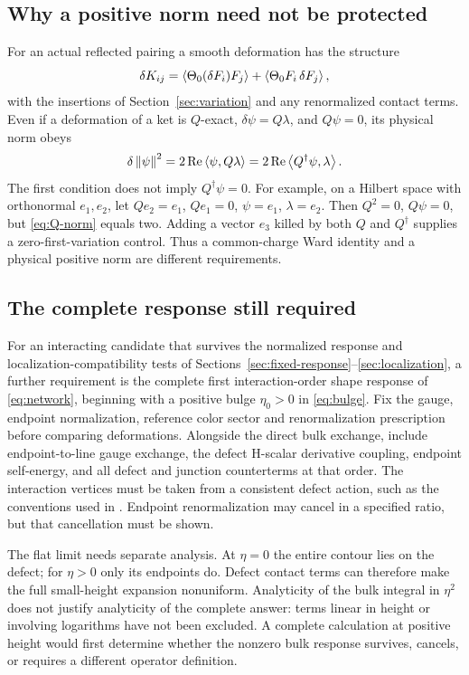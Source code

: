 \subsection{Why a positive norm need not be protected}

For an actual reflected pairing a smooth deformation has the structure
\begin{equation}
 \delta K_{ij}=\left\langle\Theta_0(\delta F_i)F_j\right\rangle
                 +\left\langle\Theta_0F_i\,\delta F_j\right\rangle,
\end{equation}
with the insertions of Section~\ref{sec:variation} and any renormalized
contact terms. Even if a deformation of a ket is $Q$-exact,
$\delta\psi=Q\lambda$, and $Q\psi=0$, its physical norm obeys
\begin{equation}\label{eq:Q-norm}
 \delta\left\lVert\psi\right\rVert^2=2\operatorname{Re}\left\langle\psi,Q\lambda\right\rangle
                  =2\operatorname{Re}\left\langle Q^\dagger\psi,\lambda\right\rangle.
\end{equation}
The first condition does not imply $Q^\dagger\psi=0$. For example,
on a Hilbert space with orthonormal $e_1,e_2$, let
$Qe_2=e_1$, $Qe_1=0$, $\psi=e_1$, $\lambda=e_2$.
Then $Q^2=0$, $Q\psi=0$, but \eqref{eq:Q-norm} equals two.
Adding a vector $e_3$ killed by both $Q$ and $Q^\dagger$ supplies a
zero-first-variation control. Thus a common-charge Ward identity
and a physical positive norm are different requirements.

\subsection{The complete response still required}


For an interacting candidate that survives the normalized response
and localization-compatibility tests of
Sections~\ref{sec:fixed-response}--\ref{sec:localization}, a further
requirement is the complete first interaction-order shape response of \eqref{eq:network}, beginning with a positive bulge
$\eta_0>0$ in \eqref{eq:bulge}. Fix the gauge, endpoint normalization,
reference color sector and renormalization prescription before
comparing deformations. Alongside the direct bulk exchange, include
endpoint-to-line gauge exchange, the defect H-scalar derivative
coupling, endpoint self-energy, and all defect and junction
counterterms at that order. The interaction vertices must be taken
from a consistent defect action, such as the conventions used in
\cite{DFO,Baker}. Endpoint renormalization may cancel in a specified
ratio, but that cancellation must be shown.

The flat limit needs separate analysis. At $\eta=0$ the entire
contour lies on the defect; for $\eta>0$ only its endpoints do.
Defect contact terms can therefore make the full small-height
expansion nonuniform. Analyticity of the bulk integral in $\eta^2$
does not justify analyticity of the complete answer: terms linear
in height or involving logarithms have not been excluded. A complete
calculation at positive height would first determine whether the
nonzero bulk response survives, cancels, or requires a different
operator definition.
